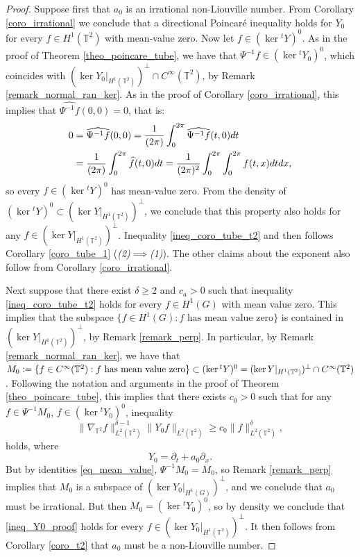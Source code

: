 \documentclass[11pt]{amsart}
\numberwithin{theorem}{section}
\numberwithin{equation}{section}
\theoremstyle{definition}
\numberwithin{example}{section}
\theoremstyle{definition}
\theoremstyle{definition}
\newcommand{\T}{\mathbb{T}}
\begin{document}
\begin{proof}
Suppose first that $a_0$ is an irrational non-Liouville number. From Corollary \ref{coro_irrational} we conclude that a directional Poincaré inequality holds for $Y_0$ for every $f\in H^1(\T^2)$ with mean-value zero. Now let $f\in (\ker {}^tY)^0$. As in the proof of Theorem \ref{theo_poincare_tube}, we have that $\Psi^{-1}f\in (\ker {}^tY_0)^0$, which coincides with $(\ker Y_0|_{H^1(\T^2)})^\perp\cap C^\infty(\T^2)$, by Remark \ref{remark_normal_ran_ker}. As in the proof of Corollary \ref{coro_irrational}, this implies that $\widehat{\Psi^{-1}f}(0,0)=0$, that is: 
\begin{align}\label{eq_mean_value}
    0&=\widehat{\Psi^{-1}f}(0,0)=\frac{1}{(2\pi)}\int_0^{2\pi}\widehat{{\Psi^{-1}f}}(t,0)dt\notag\\
    &=\frac{1}{(2\pi)}\int_0^{2\pi}\widehat{{f}}(t,0)dt=\frac{1}{(2\pi)^2}\int_0^{2\pi}\int_0^{2\pi}f(t,x)dtdx,
\end{align}
so every $f\in (\ker {}^tY)^0$ has mean-value zero. From the density of $(\ker {}^tY)^0\subset (\ker Y|_{H^1(\T^2)})^\perp$, we conclude that this property also holds for any $f\in (\ker Y|_{H^1(\T^2)})^\perp$. Inequality \eqref{ineq_coro_tube_t2} and then follows Corollary \ref{coro_tube_1} ({\it (2)}$\implies ${\it (1)}). The other claims about the exponent also follow from Corollary \ref{coro_irrational}.

Next suppose that there exist $\delta\geq 2$ and $c_a>0$ such that inequality \eqref{ineq_coro_tube_t2} holds for every $f\in H^1(G)$ with mean value zero. This implies that the subspace $\{f\in H^1(G): f \text{ has mean value zero}\}$ is contained in $(\ker Y|_{H^1(\T^2)})^\perp$, by Remark \ref{remark_perp}. In particular, by Remark \ref{remark_normal_ran_ker}, we have that $M_0\vcentcolon=\{f\in C^\infty(\T^2): f \text{ has mean value zero}\}\subset (\ker {}^tY)^0=(\ker Y|_{H^1(\T^2)})^\perp\cap C^\infty(\T^2)$. 
 Following the notation and arguments in the proof of Theorem \ref{theo_poincare_tube}, this implies that there exists $c_0>0$ such that for any $f\in \Psi^{-1}M_0$, $f\in  (\ker {}^tY_0)^0$, inequality 
\begin{equation}\label{ineq_Y0_proof}
     \|\nabla_{\T^2} f\|_{L^2(\T^2)}^{\delta-1}\| Y_0 f \|_{L^2(\T^2)}\geq c_0\|f\|_{L^2(\T^2)}^\delta,
\end{equation}
holds, where
    \begin{equation*}
        Y_0=\partial_t+a_0\partial_x.
    \end{equation*}
    But by identities \eqref{eq_mean_value}, $\Psi^{-1}M_0=M_0$, so Remark \ref{remark_perp} implies that $M_0 $ is a subspace of $(\ker Y_0|_{H^1(G)})^\perp$, and we conclude that $a_0$ must be irrational. But then $M_0=(\ker {}^tY_0)^0$, so by density we conclude that \eqref{ineq_Y0_proof} holds for every $f\in (\ker Y_0|_{H^1(\T^2)})^\perp$. It then follows from Corollary \ref{coro_t2} that $a_0$ must be a non-Liouville number.
\end{proof}
\end{document}
